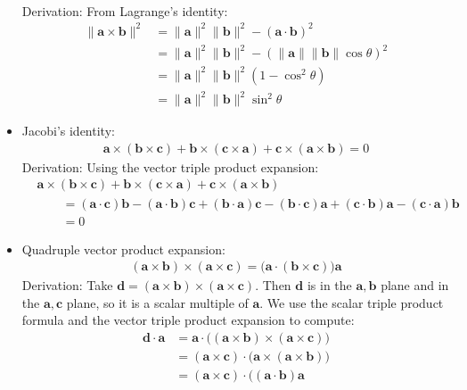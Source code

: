 \documentclass{article}
\renewcommand{\vec}[1]{\boldsymbol{#1}}
\begin{document}
\begin{itemize}
\begin{align}
  \end{align}
  Derivation: From Lagrange's identity:
  \begin{align}
    \| \vec{a} \times \vec{b} \|^2
    &= \|\vec{a}\|^2 \|\vec{b}\|^2 - (\vec{a} \cdot \vec{b})^2 \\
    &= \|\vec{a}\|^2 \|\vec{b}\|^2 - (\|\vec{a}\| \|\vec{b}\| \cos\theta)^2 \\
    &= \|\vec{a}\|^2 \|\vec{b}\|^2 (1 - \cos^2\theta) \\
    &= \|\vec{a}\|^2 \|\vec{b}\|^2 \sin^2\theta
  \end{align}
\item Jacobi's identity:
  \begin{align}
    \vec{a} \times (\vec{b} \times \vec{c})
    + \vec{b} \times (\vec{c} \times \vec{a})
    + \vec{c} \times (\vec{a} \times \vec{b})
    = 0
  \end{align}
  Derivation: Using the vector triple product expansion:
  \begin{align}
    &\vec{a} \times (\vec{b} \times \vec{c})
    + \vec{b} \times (\vec{c} \times \vec{a})
    + \vec{c} \times (\vec{a} \times \vec{b}) \\
    &\qquad= (\vec{a} \cdot \vec{c}) \vec{b} - (\vec{a} \cdot \vec{b}) \vec{c}
    + (\vec{b} \cdot \vec{a}) \vec{c} - (\vec{b} \cdot \vec{c}) \vec{a}
    + (\vec{c} \cdot \vec{b}) \vec{a} - (\vec{c} \cdot \vec{a}) \vec{b} \\
    &\qquad= 0
  \end{align}
\item Quadruple vector product expansion:
  \begin{align}
    (\vec{a} \times \vec{b}) \times (\vec{a} \times \vec{c})
    = \big( \vec{a} \cdot (\vec{b} \times \vec{c}) \big) \vec{a}
  \end{align}
  Derivation: Take $\vec{d} = (\vec{a} \times \vec{b}) \times (\vec{a}
  \times \vec{c})$. Then $\vec{d}$ is in the $\vec{a},\vec{b}$ plane
  and in the $\vec{a},\vec{c}$ plane, so it is a scalar multiple of
  $\vec{a}$. We use the scalar triple product formula and the vector
  triple product expansion to compute:
  \begin{align}
    \vec{d} \cdot \vec{a}
    &= \vec{a} \cdot \big( (\vec{a} \times \vec{b})
    \times (\vec{a} \times \vec{c}) \big) \\
    &= (\vec{a} \times \vec{c}) \cdot
    \big( \vec{a} \times (\vec{a} \times \vec{b}) \big) \\
    &= (\vec{a} \times \vec{c}) \cdot
    \big( (\vec{a} \cdot \vec{b}) \vec{a}

\end{align}
\end{itemize}
\end{document}
